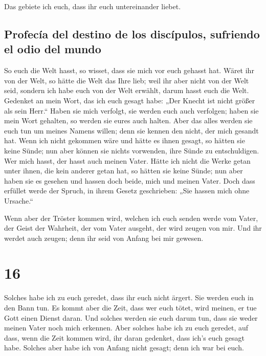  Das gebiete ich euch, dass ihr euch untereinander
liebet.

\hypertarget{profecuxeda-del-destino-de-los-discuxedpulos-sufriendo-el-odio-del-mundo}{%
\subsection{Profecía del destino de los discípulos, sufriendo el odio
del
mundo}\label{profecuxeda-del-destino-de-los-discuxedpulos-sufriendo-el-odio-del-mundo}}

 So euch die Welt hasst, so wisset, dass sie mich vor
euch gehasst hat.  Wäret ihr von der Welt, so hätte die
Welt das Ihre lieb; weil ihr aber nicht von der Welt seid, sondern ich
habe euch von der Welt erwählt, darum hasst euch die Welt.
 Gedenket an mein Wort, das ich euch gesagt habe: „Der
Knecht ist nicht größer als sein Herr.`` Haben sie mich verfolgt, sie
werden euch auch verfolgen; haben sie mein Wort gehalten, so werden sie
eures auch halten.  Aber das alles werden sie euch tun um
meines Namens willen; denn sie kennen den nicht, der mich gesandt hat.
 Wenn ich nicht gekommen wäre und hätte es ihnen gesagt,
so hätten sie keine Sünde; nun aber können sie nichts vorwenden, ihre
Sünde zu entschuldigen.  Wer mich hasst, der hasst auch
meinen Vater.  Hätte ich nicht die Werke getan unter
ihnen, die kein anderer getan hat, so hätten sie keine Sünde; nun aber
haben sie es gesehen und hassen doch beide, mich und meinen Vater.
 Doch dass erfüllet werde der Spruch, in ihrem Gesetz
geschrieben: „Sie hassen mich ohne Ursache.``

 Wenn aber der Tröster kommen wird, welchen ich euch
senden werde vom Vater, der Geist der Wahrheit, der vom Vater ausgeht,
der wird zeugen von mir.  Und ihr werdet auch zeugen;
denn ihr seid von Anfang bei mir gewesen.

\hypertarget{section-15}{%
\section{16}\label{section-15}}

 Solches habe ich zu euch geredet, dass ihr euch nicht
ärgert.  Sie werden euch in den Bann tun. Es kommt aber
die Zeit, dass wer euch tötet, wird meinen, er tue Gott einen Dienst
daran.  Und solches werden sie euch darum tun, dass sie
weder meinen Vater noch mich erkennen.  Aber solches habe
ich zu euch geredet, auf dass, wenn die Zeit kommen wird, ihr daran
gedenket, dass ich's euch gesagt habe. Solches aber habe ich von Anfang
nicht gesagt; denn ich war bei euch.

